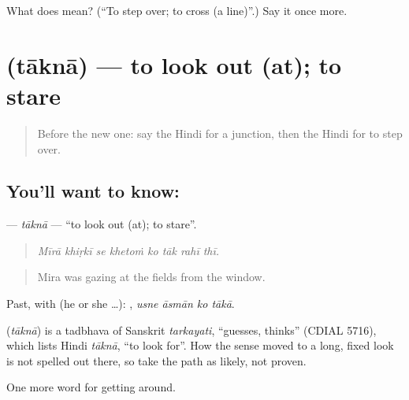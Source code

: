 \begin{tcolorbox}[breakable,colback=teal!4,colframe=teal!35!black,title={Before you move on}]
What does  mean? (\textquotedblleft{}To step over; to cross (a line)\textquotedblright{}.) Say it once more.
\end{tcolorbox}
\section[\texorpdfstring{\hi{ताकना} (tāknā)}{ताकना (tāknā)}]{ (tāknā) — to look out (at); to stare}

\label{lesson:HI-C401-takna}



\begin{quote}
Before the new one: say the Hindi for a junction, then the Hindi for to step over.
\end{quote}

\subsection*{You'll want to know: }
\textbf{} — \emph{tāknā} — \textquotedblleft{}to look out (at); to stare\textquotedblright{}.

\begin{quote}
       
\end{quote}

\begin{quote}
\emph{Mīrā khiṛkī se khetoṁ ko tāk rahī thī.}
\end{quote}

\begin{quote}
Mira was gazing at the fields from the window.
\end{quote}

Past, with  (he or she …):    , \emph{usne āsmān ko tākā}.

\begin{cousinweb}
\textbf{} (\emph{tāknā}) is a tadbhava of Sanskrit \emph{tarkayati}, \textquotedblleft{}guesses, thinks\textquotedblright{} (CDIAL 5716), which lists Hindi \emph{tāknā}, \textquotedblleft{}to look for\textquotedblright{}. How the sense moved to a long, fixed look is not spelled out there, so take the path as likely, not proven.
\end{cousinweb}

\begin{grammarlens}[title={What you've built}]
One more word for getting around.
\end{grammarlens}

